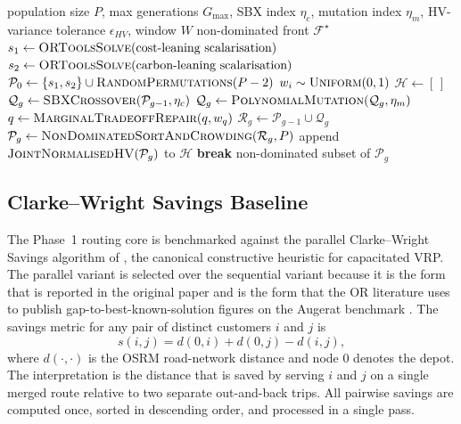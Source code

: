 \documentclass[review,preprint,authoryear,12pt]{elsarticle}
\begin{document}
\begin{algorithm}[H]
\caption{NSGA-II with OR-Tools warm-start and marginal-tradeoff repair}
\label{alg:nsga2}
\begin{algorithmic}[1]
\Require population size $P$, max generations $G_{\max}$, SBX index $\eta_c$, mutation index $\eta_m$, HV-variance tolerance $\epsilon_{HV}$, window $W$
\Ensure non-dominated front $\mathcal{F}^\star$
\State $s_1 \gets \textsc{ORToolsSolve}(\text{cost-leaning scalarisation})$
\State $s_2 \gets \textsc{ORToolsSolve}(\text{carbon-leaning scalarisation})$
\State $\mathcal{P}_0 \gets \{s_1, s_2\} \cup \textsc{RandomPermutations}(P-2)$
 
  \State $w_i \sim \textsc{Uniform}(0, 1)$
\EndFor
\State $\mathcal{H} \gets [\,]$ 
  \State $\mathcal{Q}_g \gets \textsc{SBXCrossover}(\mathcal{P}_{g-1}, \eta_c)$
  \State $\mathcal{Q}_g \gets \textsc{PolynomialMutation}(\mathcal{Q}_g, \eta_m)$
    \State $q \gets \textsc{MarginalTradeoffRepair}(q, w_q)$ 
  \EndFor
  \State $\mathcal{R}_g \gets \mathcal{P}_{g-1} \cup \mathcal{Q}_g$
  \State $\mathcal{P}_g \gets \textsc{NonDominatedSortAndCrowding}(\mathcal{R}_g, P)$
  \State append $\textsc{JointNormalisedHV}(\mathcal{P}_g)$ to $\mathcal{H}$
    \State \textbf{break} 
  \EndIf
\EndFor
\State \Return non-dominated subset of $\mathcal{P}_g$
\end{algorithmic}
\end{algorithm}

\subsection{Clarke--Wright Savings Baseline}
\label{sec:methodology:cw}

The Phase~1 routing core is benchmarked against the parallel
Clarke--Wright Savings algorithm of \citet{clarke1964savings}, the
canonical constructive heuristic for capacitated VRP. The parallel
variant is selected over the sequential variant because it is the
form that is reported in the original paper and is the form that the
OR literature uses to publish gap-to-best-known-solution figures on
the Augerat benchmark
\citep{augerat1995cvrp_branch_and_cut}. The savings metric for any
pair of distinct customers $i$ and $j$ is
\[
  s(i, j) = d(0, i) + d(0, j) - d(i, j),
\]
where $d(\cdot, \cdot)$ is the OSRM road-network distance and node
$0$ denotes the depot. The interpretation is the distance that is
saved by serving $i$ and $j$ on a single merged route relative to
two separate out-and-back trips. All pairwise savings are computed
once, sorted in descending order, and processed in a single pass.
\end{document}
